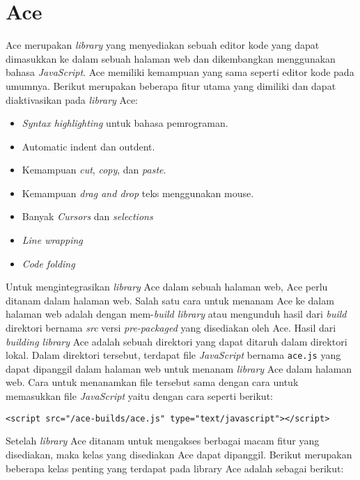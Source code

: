 \section{Ace}
\label{sec:2:ace}

Ace merupakan \textit{library} yang menyediakan sebuah editor kode yang dapat dimasukkan ke dalam sebuah halaman web dan dikembangkan menggunakan bahasa \textit{JavaScript}. Ace memiliki kemampuan yang sama seperti editor kode pada umumnya. Berikut merupakan beberapa fitur utama yang dimiliki dan dapat diaktivasikan pada \textit{library} Ace:

\begin{itemize}
	\item \textit{Syntax highlighting} untuk bahasa pemrograman.
	\item Automatic indent dan outdent.
	\item Kemampuan \textit{cut}, \textit{copy}, dan \textit{paste}.
	\item Kemampuan \textit{drag and drop} teks menggunakan mouse.
	\item Banyak \textit{Cursors} dan \textit{selections}
	\item \textit{Line wrapping}
	\item \textit{Code folding}
\end{itemize}

Untuk mengintegrasikan \textit{library} Ace dalam sebuah halaman web, Ace perlu ditanam dalam halaman web. Salah satu cara untuk menanam Ace ke dalam halaman web adalah dengan mem-\textit{build library} atau mengunduh hasil dari \textit{build} direktori bernama \textit{src} versi \textit{pre-packaged} yang disediakan oleh Ace. Hasil dari \textit{building library} Ace adalah sebuah direktori yang dapat ditaruh dalam direktori lokal. Dalam direktori tersebut, terdapat file \textit{JavaScript} bernama \verb|ace.js| yang dapat dipanggil dalam halaman web untuk menanam \textit{library} Ace dalam halaman web. Cara untuk menanamkan file tersebut sama dengan cara untuk memasukkan file \textit{JavaScript} yaitu dengan cara seperti berikut:

\begin{center}
	\verb|<script src="/ace-builds/ace.js" type="text/javascript"></script>|
\end{center}

Setelah \textit{library} Ace ditanam untuk mengakses berbagai macam fitur yang disediakan, maka kelas yang disediakan Ace dapat dipanggil. Berikut merupakan beberapa kelas penting yang terdapat pada library Ace adalah sebagai berikut:

